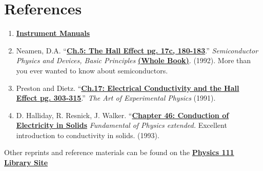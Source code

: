 \documentclass{../lab}
\begin{document}
\section{References}
\label{sec:References}

\begin{enumerate}
    \item \href{http://experimentationlab.berkeley.edu/node/106}{\textbf{Instrument Manuals}}

    \item Neamen, D.A. ``\href{http://physics111.lib.berkeley.edu/Physics111/Reprints/SHE/09-Semiconductors.pdf}{\textbf{Ch.5: The Hall Effect pg. 17c, 180-183}}.'' \emph{Semiconductor Physics and Devices, Basic Principles} \href{http://physics111.lib.berkeley.edu/Physics111/Reprints/SHE/Donald_A._Neamen_Semiconductor_Physics_And_Devices_Basic_Principles.pdf}{\textbf{ (Whole Book)}}. (1992). More than you ever wanted to know about semiconductors.

    \item Preston and Dietz. ``\href{http://physics111.lib.berkeley.edu/Physics111/Reprints/SHE/07-Electrical\_Conductivity.pdf}{\textbf{Ch.17: Electrical Conductivity and the Hall Effect pg. 303-315}}.'' \emph{The Art of Experimental Physics} (1991).

    \item D. Halliday, R. Resnick, J. Walker. ``\href{http://physics111.lib.berkeley.edu/Physics111/Reprints/SHE/Halliday\_Resnick/Ch.\%2046\%20Conduction\%20of\%20electricity\%20in\%20solids.pdf}{\textbf{Chapter 46: Conduction of Electricity in Solids}} \emph{Fundamental of Physics extended.} Excellent introduction to conductivity in solids. (1993).

\end{enumerate}

\noindent Other reprints and reference materials can be found on the \href{http://physics111.lib.berkeley.edu/Physics111/Reprints/SHE/SHE\_index.html}{\textbf{Physics 111 Library Site}}
\end{document}
